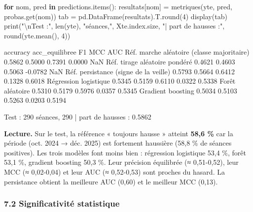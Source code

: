\documentclass[
  10pt,
]{article}
\newenvironment{Shaded}{}{}
\newcommand{\BuiltInTok}[1]{\textcolor[rgb]{0.00,0.50,0.00}{#1}}
\newcommand{\CharTok}[1]{\textcolor[rgb]{0.25,0.44,0.63}{#1}}
\newcommand{\ControlFlowTok}[1]{\textcolor[rgb]{0.00,0.44,0.13}{\textbf{#1}}}
\newcommand{\DecValTok}[1]{\textcolor[rgb]{0.25,0.63,0.44}{#1}}
\newcommand{\KeywordTok}[1]{\textcolor[rgb]{0.00,0.44,0.13}{\textbf{#1}}}
\newcommand{\NormalTok}[1]{#1}
\newcommand{\OperatorTok}[1]{\textcolor[rgb]{0.40,0.40,0.40}{#1}}
\newcommand{\StringTok}[1]{\textcolor[rgb]{0.25,0.44,0.63}{#1}}
\begin{document}
\begin{Shaded}
\begin{Highlighting}[]
\ControlFlowTok{for}\NormalTok{ nom, pred }\KeywordTok{in}\NormalTok{ predictions.items():}
\NormalTok{    resultats[nom] }\OperatorTok{=}\NormalTok{ metriques(yte, pred, probas.get(nom))}
\NormalTok{tab }\OperatorTok{=}\NormalTok{ pd.DataFrame(resultats).T.}\BuiltInTok{round}\NormalTok{(}\DecValTok{4}\NormalTok{)}
\NormalTok{display(tab)}
\BuiltInTok{print}\NormalTok{(}\StringTok{"}\CharTok{\textbackslash{}n}\StringTok{Test :"}\NormalTok{, }\BuiltInTok{len}\NormalTok{(yte), }\StringTok{"séances,"}\NormalTok{, Xte.index.size, }\StringTok{"| part de hausses :"}\NormalTok{, }\BuiltInTok{round}\NormalTok{(yte.mean(), }\DecValTok{4}\NormalTok{))}
\end{Highlighting}
\end{Shaded}

\begin{Shaded}
\begin{Highlighting}[]
\NormalTok{                                            accuracy  acc\_equilibree      F1     MCC     AUC}
\NormalTok{Réf. marche aléatoire (classe majoritaire)    0.5862          0.5000  0.7391  0.0000     NaN}
\NormalTok{Réf. tirage aléatoire pondéré                 0.4621          0.4603  0.5063 {-}0.0782     NaN}
\NormalTok{Réf. persistance (signe de la veille)         0.5793          0.5664  0.6412  0.1328  0.6018}
\NormalTok{Régression logistique                         0.5345          0.5159  0.6110  0.0322  0.5338}
\NormalTok{Forêt aléatoire                               0.5310          0.5179  0.5976  0.0357  0.5345}
\NormalTok{Gradient boosting                             0.5034          0.5103  0.5263  0.0203  0.5194}

\NormalTok{Test : 290 séances, 290 | part de hausses : 0.5862}
\end{Highlighting}
\end{Shaded}

\textbf{Lecture.} Sur le test, la référence « toujours hausse » atteint
\textbf{58,6 \%} car la période (oct. 2024 → déc. 2025) est fortement
haussière (58,8 \% de séances positives). Les trois modèles font moins
bien : régression logistique 53,4 \%, forêt 53,1 \%, gradient boosting
50,3 \%. Leur précision équilibrée (≈ 0,51-0,52), leur MCC (≈ 0,02-0,04)
et leur AUC (≈ 0,52-0,53) sont proches du hasard. La persistance obtient
la meilleure AUC (0,60) et le meilleur MCC (0,13).

\hypertarget{significativituxe9-statistique}{%
\subsubsection{7.2 Significativité
statistique}\label{significativituxe9-statistique}}
\end{document}
